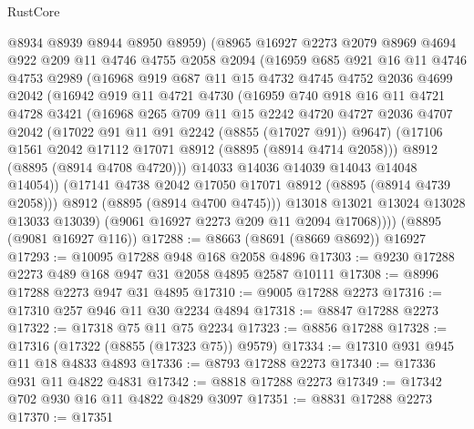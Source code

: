 \begin{lexlean}{RustCore}
\begin{coremodule}
          @8934
          @8939
          @8944
          @8950
          @8959)
        (@8965
          @16927
          @2273
          @2079
          @8969
          @4694
          @922
          @209
          @11
          @4746
          @4755
          @2058
          @2094
          (@16959
            @685
            @921
            @16
            @11
            @4746
            @4753
            @2989
            (@16968
              @919
              @687
              @11
              @15
              @4732
              @4745
              @4752
              @2036
              @4699
              @2042
              (@16942
                @919
                @11
                @4721
                @4730
                (@16959
                  @740
                  @918
                  @16
                  @11
                  @4721
                  @4728
                  @3421
                  (@16968
                    @265
                    @709
                    @11
                    @15
                    @2242
                    @4720
                    @4727
                    @2036
                    @4707
                    @2042
                    (@17022 @91 @11 @91 @2242 (@8855 (@17027 @91)) @9647)
                    (@17106 @1561 @2042 @17112 @17071 @8912 (@8895 (@8914 @4714 @2058)))
                    @8912
                    (@8895 (@8914 @4708 @4720)))
                  @14033
                  @14036
                  @14039
                  @14043
                  @14048
                  @14054))
              (@17141 @4738 @2042 @17050 @17071 @8912 (@8895 (@8914 @4739 @2058)))
              @8912
              (@8895 (@8914 @4700 @4745)))
            @13018
            @13021
            @13024
            @13028
            @13033
            @13039)
          (@9061 @16927 @2273 @209 @11 @2094 @17068))))
    (@8895 (@9081 @16927 @116))
@17288 := @8663 (@8691 (@8669 @8692)) @16927
@17293 := @10095 @17288 @948 @168 @2058 @4896
@17303 := @9230 @17288 @2273 @489 @168 @947 @31 @2058 @4895 @2587 @10111
@17308 := @8996 @17288 @2273 @947 @31 @4895
@17310 := @9005 @17288 @2273
@17316 := @17310 @257 @946 @11 @30 @2234 @4894
@17318 := @8847 @17288 @2273
@17322 := @17318 @75 @11 @75 @2234
@17323 := @8856 @17288
@17328 := @17316 (@17322 (@8855 (@17323 @75)) @9579)
@17334 := @17310 @931 @945 @11 @18 @4833 @4893
@17336 := @8793 @17288 @2273
@17340 := @17336 @931 @11 @4822 @4831
@17342 := @8818 @17288 @2273
@17349 := @17342 @702 @930 @16 @11 @4822 @4829 @3097
@17351 := @8831 @17288 @2273
@17370 := @17351

\end{coremodule}
\end{lexlean}
